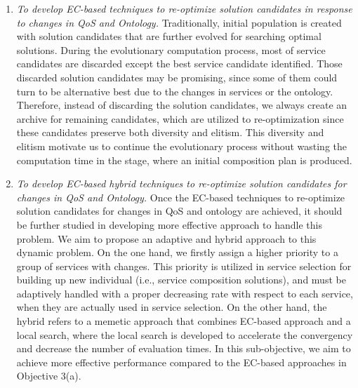 \begin{enumerate}
  \begin{enumerate}
 \item \label{Obj:3.1} \emph{To develop EC-based techniques to re-optimize solution candidates in response to changes in QoS and Ontology.} Traditionally, initial population is created with solution candidates that are further evolved for searching optimal solutions. During the evolutionary computation process, most of service candidates are discarded except the best service candidate identified. Those discarded solution candidates may be promising, since some of them could turn to be alternative best due to the changes in services or the ontology. Therefore, instead of discarding the solution candidates, we always create an archive for remaining candidates, which are utilized to re-optimization since these candidates preserve both diversity and elitism. This diversity and elitism motivate us to continue the evolutionary process without wasting the computation time in the stage, where an initial composition plan is produced.

 \item \emph{To develop EC-based hybrid techniques to re-optimize solution candidates for changes in QoS and Ontology.} Once the EC-based techniques to re-optimize solution candidates for changes in QoS and ontology are achieved, it should be further studied in developing more effective approach to handle this problem. We aim to propose an adaptive and hybrid approach to this dynamic problem. On the one hand, we firstly assign a higher priority to a group of services with changes. This priority is utilized in service selection for building up new individual (i.e., service composition solutions), and must be adaptively handled with a proper decreasing rate with respect to each service, when they are actually used in service selection. On the other hand, the hybrid refers to a memetic approach that combines EC-based approach and a local search, where the local search is developed to accelerate the convergency and decrease the number of evaluation times. In this sub-objective, we aim to achieve more effective performance compared to the EC-based approaches in Objective 3(a).
 

\end{enumerate}
\end{enumerate}
